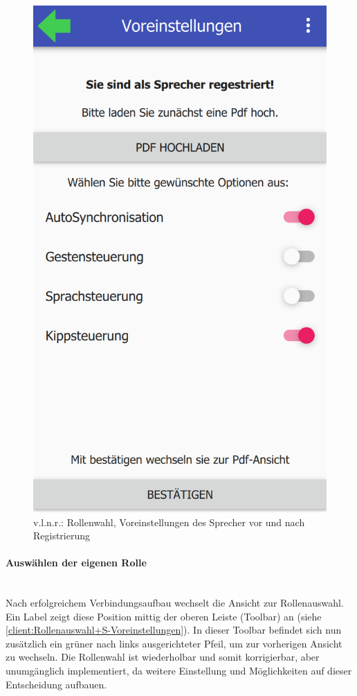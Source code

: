 \begin{figure}[ht!]
\begin{minipage}{0.31\linewidth}
		\includegraphics[scale=0.5]{GUI/Bilder/3-S-5-Voreinstellung.PNG}
	\end{minipage}
	\caption{v.l.n.r.: Rollenwahl, Voreinstellungen des Sprecher vor und nach Registrierung{\tiny}}
	\label{client:Rollenauswahl+S-Voreinstellungen}
\end{figure}

\newpage

\paragraph{Auswählen der eigenen Rolle}$\;$\\
Nach erfolgreichem Verbindungsaufbau wechselt die Ansicht zur Rollenauswahl. Ein Label zeigt diese Position mittig der oberen Leiste (Toolbar) an (siehe \autoref{client:Rollenauswahl+S-Voreinstellungen}).
In dieser Toolbar befindet sich nun zusätzlich ein grüner nach links ausgerichteter Pfeil, um zur vorherigen Ansicht zu wechseln. Die Rollenwahl ist wiederholbar und somit korrigierbar, aber unumgänglich implementiert, da weitere Einstellung und Möglichkeiten auf dieser Entscheidung aufbauen.

